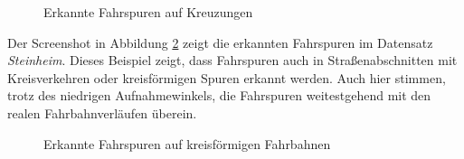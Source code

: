 \begin{figure}[H]
    \centering
    \caption{Erkannte Fahrspuren auf Kreuzungen}
    \label{fig:results_lanes2}
\end{figure}

Der Screenshot in Abbildung \ref{fig:results_lanes3} zeigt die erkannten Fahrspuren im Datensatz \textit{Steinheim}.
Dieses Beispiel zeigt, dass Fahrspuren auch in Straßenabschnitten mit Kreisverkehren oder kreisförmigen Spuren
erkannt werden. Auch hier stimmen, trotz des niedrigen Aufnahmewinkels, die Fahrspuren weitestgehend
mit den realen Fahrbahnverläufen überein.


\begin{figure}[H]
    \centering
    \caption{Erkannte Fahrspuren auf kreisförmigen Fahrbahnen}
    \label{fig:results_lanes3}
\end{figure}

